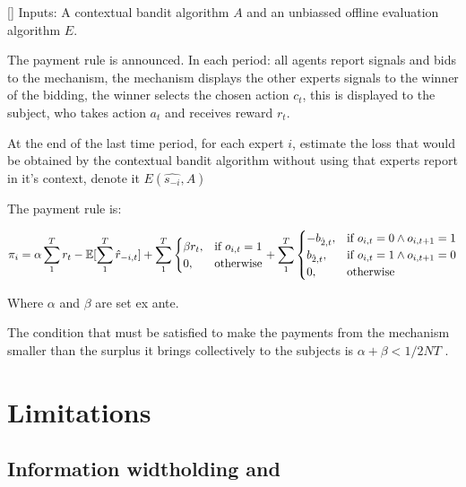 \begin{mech}\label{mech:bidbandit}[]
Inputs: A contextual bandit algorithm $A$ and an unbiassed offline evaluation algorithm $E$.


The payment rule is announced.
 In each period: all agents report signals and bids to the mechanism, the mechanism displays the other experts signals to the winner of the bidding, the winner selects the chosen action $c_t$, this is displayed to the subject, who takes action $a_t$ and receives reward $r_t$.

At the end of the last time period, for each expert $i$, estimate the loss that would be obtained by the contextual bandit algorithm without using that experts report in it's context, denote it $E(\hat{s_{-i}},A)$



The payment rule is:

\[
    \pi_i = 
\alpha \sum_1^T r_t -  \expec[\sum_1^T \hat{r}_{-i,t}]
+
\sum_1^T
\begin{cases}
    \beta r_t ,& \text{if } o_{i,t} = 1\\
     0,              & \text{otherwise}
\end{cases}
+
\sum_1^T
\begin{cases}
     - b_{\hat{2},t} ,& \text{if } o_{i,t} = 0 \land o_{i,t+1} = 1\\
       b_{\hat{2},t} ,& \text{if } o_{i,t} = 1 \land o_{i,t+1} = 0 \\
	   0,              & \text{otherwise}
\end{cases}
\]

Where $\alpha$ and $\beta$ are set ex ante. 
\end{mech}


The condition that must be satisfied to make the payments from the mechanism smaller than the surplus it brings collectively to the subjects is $ \alpha + \beta < 1/2NT$ .


\section{Limitations}

\subsection{Information widtholding and}


